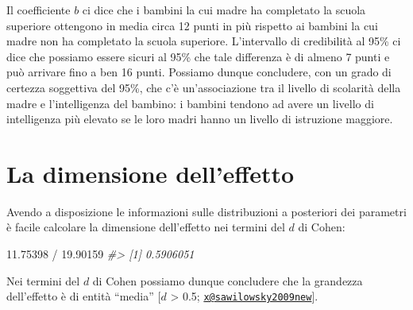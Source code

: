 \documentclass[
]{memoir}
\newenvironment{Shaded}{\begin{snugshade}}{\end{snugshade}}
\newcommand{\CommentTok}[1]{\textcolor[rgb]{0.56,0.35,0.01}{\textit{#1}}}
\newcommand{\FloatTok}[1]{\textcolor[rgb]{0.00,0.00,0.81}{#1}}
\newcommand{\SpecialCharTok}[1]{\textcolor[rgb]{0.00,0.00,0.00}{#1}}
\begin{document}
Il coefficiente \(b\) ci dice che i bambini la cui madre ha completato la scuola superiore ottengono in media circa 12 punti in più rispetto ai bambini la cui madre non ha completato la scuola superiore. L'intervallo di credibilità al 95\% ci dice che possiamo essere sicuri al 95\% che tale differenza è di almeno 7 punti e può arrivare fino a ben 16 punti. Possiamo dunque concludere, con un grado di certezza soggettiva del 95\%, che c'è un'associazione tra il livello di scolarità della madre e l'intelligenza del bambino: i bambini tendono ad avere un livello di intelligenza più elevato se le loro madri hanno un livello di istruzione maggiore.

\hypertarget{la-dimensione-delleffetto}{%
\section{La dimensione dell'effetto}\label{la-dimensione-delleffetto}}

Avendo a disposizione le informazioni sulle distribuzioni a posteriori dei parametri è facile calcolare la dimensione dell'effetto nei termini del \(d\) di Cohen:

\begin{Shaded}
\begin{Highlighting}[]
\FloatTok{11.75398} \SpecialCharTok{/} \FloatTok{19.90159} 
\CommentTok{\#\textgreater{} [1] 0.5906051}
\end{Highlighting}
\end{Shaded}

\noindent
Nei termini del \(d\) di Cohen possiamo dunque concludere che la grandezza dell'effetto è di entità ``media'' {[}\(d\) \textgreater{} 0.5; \href{mailto:x@sawilowsky2009new}{\nolinkurl{x@sawilowsky2009new}}{]}.

  
\end{document}
